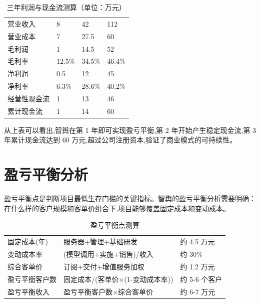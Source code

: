 \begin{table}[htbp]
	\centering
	\caption{三年利润与现金流测算（单位：万元）}
	\begin{tabularx}{\textwidth}{L{4cm}C{2cm}C{2cm}C{2cm}}
		\toprule
		 &  &  &  \\
		\midrule
		营业收入         & 8               & 42              & 112             \\
		营业成本         & 7               & 27.5            & 60              \\
		毛利润          & 1               & 14.5            & 52              \\
		毛利率          & 12.5\%          & 34.5\%          & 46.4\%          \\
		净利润          & 0.5             & 12              & 45              \\
		净利率          & 6.3\%           & 28.6\%          & 40.2\%          \\
		经营性现金流       & 1               & 13              & 46              \\
		累计现金流        & 1               & 14              & 60              \\
		\bottomrule
	\end{tabularx}
\end{table}

从上表可以看出,智舆在第 1 年即可实现盈亏平衡,第 2 年开始产生稳定现金流,第 3 年累计现金流达到 60 万元,超过公司注册资本,验证了商业模式的可持续性。

\section{盈亏平衡分析}

盈亏平衡点是判断项目最低生存门槛的关键指标。智舆的盈亏平衡分析需要明确：在什么样的客户规模和客单价组合下,项目能够覆盖固定成本和变动成本。

\begin{table}[htbp]
	\centering
	\caption{盈亏平衡点测算}
	\begin{tabularx}{\textwidth}{L{4cm}YL{3cm}}
		\toprule
		 &        &  \\
		\midrule
		固定成本(年)      & 服务器+管理+基础研发          & 约 4.5 万元     \\
		变动成本率        & (模型调用+实施+销售)/收入      & 约 30\%       \\
		综合客单价        & 订阅+交付+增值服务加权         & 约 1.2 万元     \\
		盈亏平衡客户数      & 固定成本/(客单价×(1-变动成本率)) & 约 5-6 个客户    \\
		盈亏平衡收入       & 盈亏平衡客户数×综合客单价        & 约 6-7 万元     \\
		\bottomrule
	\end{tabularx}
\end{table}

